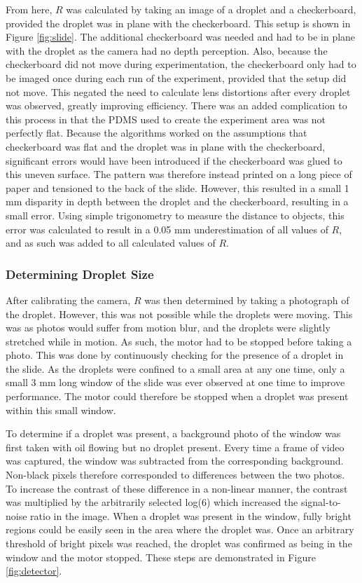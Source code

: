 \documentclass{physics_article_B}
\begin{document}
            
            From here, $R$ was calculated by taking an image of a droplet and a checkerboard, provided the droplet was in plane with the checkerboard. This setup is shown in Figure \ref{fig:slide}. The additional checkerboard was needed and had to be in plane with the droplet as the camera had no depth perception. Also, because the checkerboard did not move during experimentation, the checkerboard only had to be imaged once during each run of the experiment, provided that the setup did not move. This negated the need to calculate lens distortions after every droplet was observed, greatly improving efficiency. 
            There was an added complication to this process in that the PDMS used to create the experiment area was not perfectly flat. Because the algorithms worked on the assumptions that checkerboard was flat and the droplet was in plane with the checkerboard, significant errors would have been introduced if the checkerboard was glued to this uneven surface. The pattern was therefore instead printed on a long piece of paper and tensioned to the back of the slide. However, this resulted in a small 1 mm disparity in depth between the droplet and the checkerboard, resulting in a small error. Using simple trigonometry to measure the distance to objects, this error was calculated to result in a 0.05 mm underestimation of all values of $R$, and as such was added to all calculated values of $R$. 
        
        \subsubsection{Determining Droplet Size\label{sect:method:vision:size}}
                
                After calibrating the camera, $R$ was then determined by taking a photograph of the droplet. However, this was not possible while the droplets were moving. This was as photos would suffer from motion blur, and the droplets were slightly stretched while in motion. As such, the motor had to be stopped before taking a photo. This was done by continuously checking for the presence of a droplet in the slide. As the droplets were confined to a small area at any one time, only a small 3 mm long window of the slide was ever observed at one time to improve performance. The motor could therefore be stopped when a droplet was present within this small window. 
                
                To determine if a droplet was present, a background photo of the window was first taken with oil flowing but no droplet present. Every time a frame of video was captured, the window was subtracted from the corresponding background. Non-black pixels therefore corresponded to differences between the two photos. To increase the contrast of these difference in a non-linear manner, the contrast was multiplied by the arbitrarily selected log(6) which increased the signal-to-noise ratio in the image. When a droplet was present in the window, fully bright regions could be easily seen in the area where the droplet was. Once an arbitrary threshold of bright pixels was reached, the droplet was confirmed as being in the window and the motor stopped. These steps are demonstrated in Figure \ref{fig:detector}.
            
\end{document}

